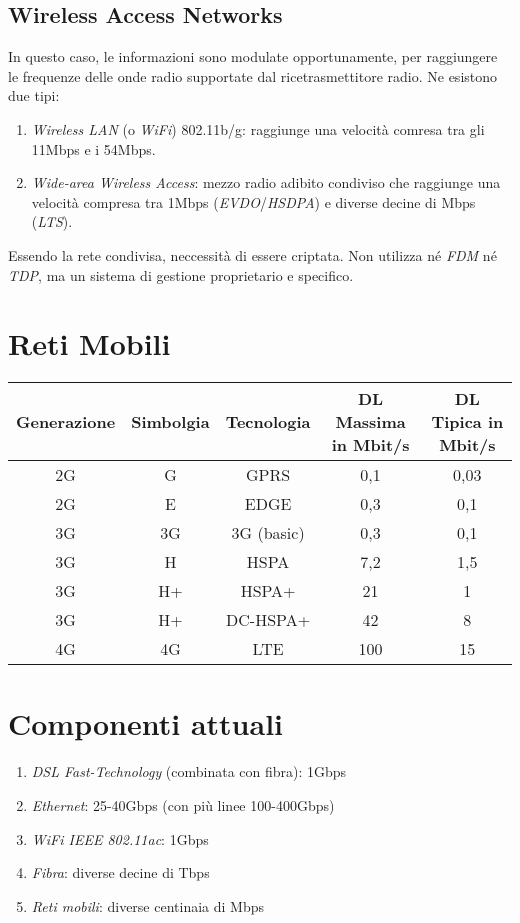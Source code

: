 \subsection{Wireless Access Networks}
In questo caso, le informazioni sono modulate opportunamente, per raggiungere le frequenze delle onde radio supportate dal ricetrasmettitore radio.
Ne esistono due tipi:
\begin{enumerate}
	\item \textit{Wireless LAN} (o \textit{WiFi}) 802.11b/g: raggiunge una velocità comresa tra gli 11Mbps e i 54Mbps.
	\item \textit{Wide-area Wireless Access}: mezzo radio adibito condiviso che raggiunge una velocità compresa tra 1Mbps (\textit{EVDO}/\textit{HSDPA}) e diverse decine di Mbps (\textit{LTS}).
\end{enumerate}
Essendo la rete condivisa, neccessità di essere criptata. Non utilizza né \textit{FDM} né \textit{TDP}, ma un sistema di gestione proprietario e specifico.

\section{Reti Mobili}
\begin{center}
	\begin{tabular}{| c | c | c | c | c |}
		\hline
		\textbf{Generazione} & \textbf{Simbolgia} & \textbf{Tecnologia } & \textbf{DL Massima} in Mbit/s & \textbf{DL Tipica} in Mbit/s \\ \hline
		2G & G & GPRS & 0,1 & 0,03 \\ \hline
		2G & E & EDGE & 0,3 & 0,1 \\ \hline
		3G & 3G & 3G (basic) & 0,3 & 0,1 \\ \hline
		3G & H & HSPA & 7,2 & 1,5 \\ \hline
		3G & H+ & HSPA+ & 21 & 1 \\ \hline
		3G & H+ & DC-HSPA+ & 42 & 8 \\ \hline
		4G & 4G & LTE & 100 & 15 \\ \hline
	\end{tabular}
\end{center}

\section{Componenti attuali}
\begin{enumerate}
	\item \textit{DSL Fast-Technology} (combinata con fibra): 1Gbps
	\item \textit{Ethernet}: 25-40Gbps (con più linee 100-400Gbps)
	\item \textit{WiFi IEEE 802.11ac}: 1Gbps
	\item \textit{Fibra}: diverse decine di Tbps
	\item \textit{Reti mobili}: diverse centinaia di Mbps
\end{enumerate}

